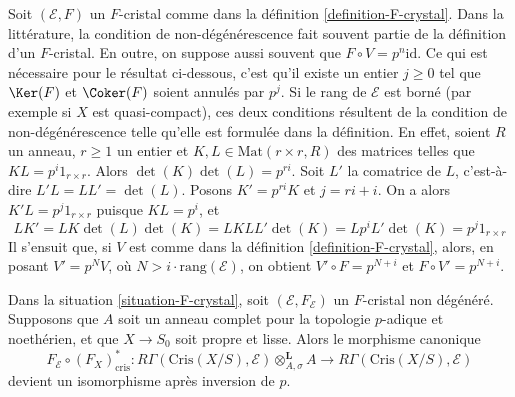 \begin{remark}
\label{remark-F-crystal-variants}
Soit $(\mathcal{E}, F)$ un $F$-cristal comme dans la
définition \ref{definition-F-crystal}.
Dans la littérature, la condition de non-dégénérescence fait souvent partie de la
définition d'un $F$-cristal. En outre, on suppose aussi souvent que
$F \circ V = p^n\text{id}$. Ce qui est nécessaire pour le résultat ci-dessous, c'est
qu'il existe un entier $j \geq 0$ tel que $\Ker(F)$ et
$\Coker(F)$ soient annulés par $p^j$. Si le rang de $\mathcal{E}$
est borné (par exemple si $X$ est quasi-compact), ces deux
conditions résultent de la condition de non-dégénérescence telle qu'elle est formulée dans
la définition. En effet, soient $R$ un anneau, $r \geq 1$ un entier et
$K, L \in \text{Mat}(r \times r, R)$ des matrices telles que
$K L = p^i 1_{r \times r}$. Alors $\det(K)\det(L) = p^{ri}$. 
Soit $L'$ la comatrice de $L$, c'est-à-dire
$L' L = L L' = \det(L)$. Posons $K' = p^{ri} K$ et $j = ri + i$.
On a alors $K' L = p^j 1_{r \times r}$ puisque $K L = p^i$, et
$$
L K' = L K \det(L) \det(K) = L K L L' \det(K) = L p^i L' \det(K) =
p^j 1_{r \times r}
$$
Il s'ensuit que, si $V$ est comme dans la définition \ref{definition-F-crystal},
alors, en posant $V' = p^N V$, où $N > i \cdot \text{rang}(\mathcal{E})$,
on obtient $V' \circ F = p^{N + i}$ et $F \circ V' = p^{N + i}$.
\end{remark}

\begin{theorem}
\label{theorem-cohomology-F-crystal}
Dans la situation \ref{situation-F-crystal}, soit $(\mathcal{E}, F_\mathcal{E})$
un $F$-cristal non dégénéré. Supposons que $A$ soit un anneau complet pour la topologie $p$-adique
et noethérien, et que $X \to S_0$ soit propre et lisse. Alors
le morphisme canonique
$$
F_\mathcal{E} \circ (F_X)_{\text{cris}}^* :
R\Gamma(\text{Cris}(X/S), \mathcal{E}) \otimes^\mathbf{L}_{A, \sigma} A
\longrightarrow
R\Gamma(\text{Cris}(X/S), \mathcal{E})
$$
devient un isomorphisme après inversion de $p$.
\end{theorem}

